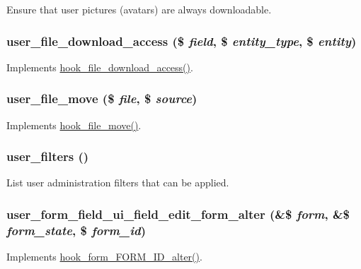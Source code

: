 Ensure that user pictures (avatars) are always downloadable. \hypertarget{user_8module_a60c0db0f629d04f71229798339e155fb}{
\subsubsection[{user\_\-file\_\-download\_\-access}]{\setlength{\rightskip}{0pt plus 5cm}user\_\-file\_\-download\_\-access (\$ {\em field}, \/  \$ {\em entity\_\-type}, \/  \$ {\em entity})}}
\label{user_8module_a60c0db0f629d04f71229798339e155fb}
Implements \hyperlink{file_8api_8php_ae72c8feceec1072762bffc3ba020aa2a}{hook\_\-file\_\-download\_\-access()}. \hypertarget{user_8module_a911b761d015b504f3e545b17f1403957}{
\subsubsection[{user\_\-file\_\-move}]{\setlength{\rightskip}{0pt plus 5cm}user\_\-file\_\-move (\$ {\em file}, \/  \$ {\em source})}}
\label{user_8module_a911b761d015b504f3e545b17f1403957}
Implements \hyperlink{group__hooks_ga7053514a7a923b43960b31cacfa9ce95}{hook\_\-file\_\-move()}. \hypertarget{user_8module_a898a8a080e136ca20a94b1f3e3e04fd5}{
\subsubsection[{user\_\-filters}]{\setlength{\rightskip}{0pt plus 5cm}user\_\-filters ()}}
\label{user_8module_a898a8a080e136ca20a94b1f3e3e04fd5}
List user administration filters that can be applied. \hypertarget{user_8module_ab71e2dd6088fa2ef32b2e8a71e85fbbe}{
\subsubsection[{user\_\-form\_\-field\_\-ui\_\-field\_\-edit\_\-form\_\-alter}]{\setlength{\rightskip}{0pt plus 5cm}user\_\-form\_\-field\_\-ui\_\-field\_\-edit\_\-form\_\-alter (\&\$ {\em form}, \/  \&\$ {\em form\_\-state}, \/  \$ {\em form\_\-id})}}
\label{user_8module_ab71e2dd6088fa2ef32b2e8a71e85fbbe}
Implements \hyperlink{group__hooks_ga8d4a4089551493d55911bd5c4f218264}{hook\_\-form\_\-FORM\_\-ID\_\-alter()}.

